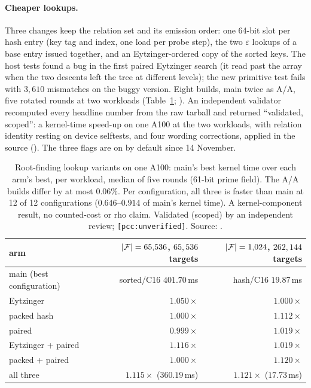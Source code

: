 \paragraph{Cheaper lookups.} Three changes keep the relation set and its
emission order: one 64-bit slot per hash entry (key tag and index, one load
per probe step), the two $\varepsilon$ lookups of a base entry issued
together, and an Eytzinger-ordered copy of the sorted keys. The host tests
found a bug in the first paired Eytzinger search (it read past the array
when the two descents left the tree at different levels); the new
primitive test fails with $3{,}610$ mismatches on the buggy version. Eight
builds, main twice as A/A, five rotated rounds at two workloads
(Table~\ref{tab:rf-gpu-lookup};
). An independent
validator recomputed every headline number from the raw tarball and
returned ``validated, scoped'': a kernel-time speed-up on one A100 at the
two workloads, with relation identity resting on device selftests, and four
wording corrections, applied in the source
(). The
three flags are on by default since 14 November.

\begin{table}[t]
\centering\small
\begin{tabular}{@{}lrr@{}}
\toprule
arm & $\lvert \mathcal{F} \rvert=65{,}536$, $65{,}536$ targets & $\lvert \mathcal{F} \rvert=1{,}024$, $262{,}144$ targets \\
\midrule
main (best configuration) & sorted/C16 $401.70$\,ms & hash/C16 $19.87$\,ms \\
Eytzinger & $1.050\times$ & $1.000\times$ \\
packed hash & $1.000\times$ & $1.112\times$ \\
paired & $0.999\times$ & $1.019\times$ \\
Eytzinger + paired & $1.116\times$ & $1.019\times$ \\
packed + paired & $1.000\times$ & $1.120\times$ \\
all three & $\mathbf{1.115\times}$ ($360.19$\,ms) & $\mathbf{1.121\times}$ ($17.73$\,ms) \\
\bottomrule
\end{tabular}
\caption[]{Root-finding lookup variants on one A100: main's best kernel
time over each arm's best, per workload, median of five rounds (61-bit
prime field). The A/A builds differ by at most $0.06\%$. Per
configuration, all three is faster than main at 12 of 12 configurations
($0.646$--$0.914$ of main's kernel time). A kernel-component result, no
counted-cost or rho claim. Validated (scoped) by an independent review;
\texttt{[pcc:unverified]}. Source:
.}
\label{tab:rf-gpu-lookup}
\end{table}

